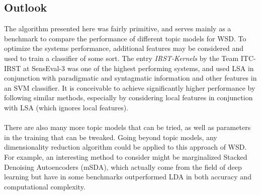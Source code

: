 \subsection{Outlook}
The algorithm presented here was fairly primitive, and serves mainly as a benchmark to compare the performance of different topic models for WSD. To optimize the systems performance, additional features may be considered and used to train a classifier of some sort. The entry \textit{IRST-Kernels} by the Team ITC-IRST at SensEval-3 was one of the highest performing systems, and used LSA in conjunction with paradigmatic and syntagmatic information and other features in an SVM classifier\cite{senseval3paper}. It is conceivable to achieve significantly higher performance by following similar methods, especially by considering local features in conjunction with LSA (which ignores local features).\\\\
There are also many more topic models that can be tried, as well as parameters in the training that can be tweaked. Going beyond topic models, any dimensionality reduction algorithm could be applied to this approach of WSD. For example, an interesting method to consider might be marginalized Stacked Denoising Autoencoders (mSDA), which actually come from the field of deep learning but have in some benchmarks outperformed LDA in both accuracy and computational complexity\cite{msda}.



